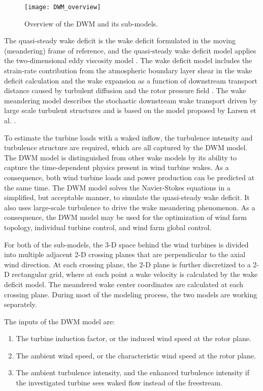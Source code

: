 \documentclass{umthesis}
\begin{document}
\begin{figure}
  \centering
  \texttt{[image: DWM\_overview]}
  \caption{Overview of the DWM and its sub-models.}\label{fig:DWM_overview}
\end{figure}

The quasi-steady wake deficit is the wake deficit formulated in the moving (meandering) frame of reference, and the quasi-steady wake deficit model applies the two-dimensional eddy viscosity model \cite{Keck_mixing}. The wake deficit model includes the strain-rate contribution from the atmospheric boundary layer shear in the wake deficit calculation and the wake expansion as a function of downstream transport distance caused by turbulent diffusion and the rotor pressure field \cite{Keck_two}. The wake meandering model describes the stochastic downstream wake transport driven by large scale turbulent structures and is based on the model proposed by Larsen et al. \cite{Larsen_meandering}.

To estimate the turbine loads with a waked inflow, the turbulence intensity and turbulence structure are required, which are all captured by the DWM model. The DWM model is distinguished from other wake models by its ability to capture the time-dependent physics present in wind turbine wakes. As a consequence, both wind turbine loads and power production can be predicted at the same time. The DWM model solves the Navier-Stokes equations in a simplified, but acceptable manner, to simulate the quasi-steady wake deficit. It also uses large-scale turbulence to drive the wake meandering phenomenon. As a consequence, the DWM model may be used for the optimization of wind farm topology, individual turbine control, and wind farm global control.

For both of the sub-models, the 3-D space behind the wind turbines is divided into multiple adjacent 2-D crossing planes that are perpendicular to the axial wind direction. At each crossing plane, the 2-D plane is further discretized to a 2-D rectangular grid, where at each point a wake velocity is calculated by the wake deficit model. The meandered wake center coordinates are calculated at each crossing plane. During most of the modeling process, the two models are working separately.

The inputs of the DWM model are:
\begin{enumerate}
  \item The turbine induction factor, or the induced wind speed at the rotor plane.
  \item The ambient wind speed, or the characteristic wind speed at the rotor plane.
  \item The ambient turbulence intensity, and the enhanced turbulence intensity if the investigated turbine sees waked flow instead of the freestream.
\end{enumerate}
\end{document}
